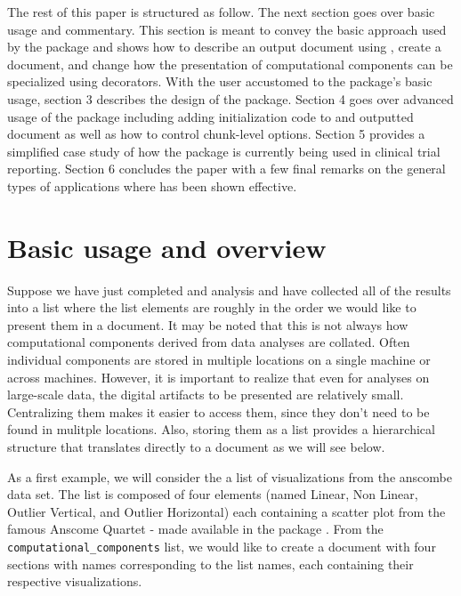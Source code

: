 \documentclass[
]{jss}
\begin{document}
The rest of this paper is structured as follow. The next section goes
over basic usage and commentary. This section is meant to convey the
basic approach used by the package and shows how to describe an output
document using , create a document, and change how the
presentation of computational components can be specialized using
 decorators. With the user accustomed to the package's
basic usage, section 3 describes the design of the package. Section 4
goes over advanced usage of the package including adding initialization
code to and outputted document as well as how to control chunk-level
options. Section 5 provides a simplified case study of how the package
is currently being used in clinical trial reporting. Section 6 concludes
the paper with a few final remarks on the general types of applications
where  has been shown effective.

\hypertarget{basic-usage-and-overview}{%
\section{Basic usage and overview}\label{basic-usage-and-overview}}

Suppose we have just completed and analysis and have collected all of
the results into a list where the list elements are roughly in the order
we would like to present them in a document. It may be noted that this
is not always how computational components derived from data analyses
are collated. Often individual components are stored in multiple
locations on a single machine or across machines. However, it is
important to realize that even for analyses on large-scale data, the
digital artifacts to be presented are relatively small. Centralizing
them makes it easier to access them, since they don't need to be found
in mulitple locations. Also, storing them as a list provides a
hierarchical structure that translates directly to a document as we will
see below.

As a first example, we will consider the a list of visualizations from
the anscombe data set. The list is composed of four 
\citep{wickham2016}elements (named Linear, Non Linear, Outlier Vertical,
and Outlier Horizontal) each containing a scatter plot from the famous
Anscome Quartet - made available in the  package
\citep{R}. From the \texttt{computational\_components} list, we would
like to create a document with four sections with names corresponding to
the list names, each containing their respective visualizations.
\end{document}
